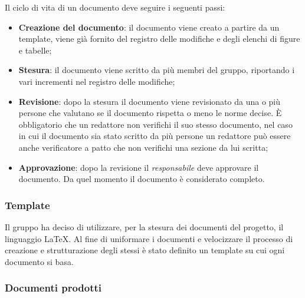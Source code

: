 Il ciclo di vita di un documento deve seguire i seguenti passi:
\begin{itemize}
    \item \textbf{Creazione del documento}: il documento viene creato a partire da un template, viene già fornito del registro delle modifiche e degli elenchi di figure e tabelle;
    \item \textbf{Stesura}: il documento viene scritto da più membri del gruppo, riportando i vari incrementi nel registro delle modifiche;
    \item \textbf{Revisione}: dopo la stesura il documento viene revisionato da una o più persone che valutano se il documento rispetta o meno le norme decise. È obbligatorio che un redattore non verifichi il suo stesso documento, nel caso in cui il documento sia stato scritto da più persone un redattore può essere anche verificatore a patto che non verifichi una sezione da lui scritta;
    \item \textbf{Approvazione}: dopo la revisione il \emph{responsabile} deve approvare il documento. Da quel momento il documento è considerato completo.
\end{itemize}

\subsubsection{Template}
\label{ssub:template}

Il gruppo ha deciso di utilizzare, per la stesura dei documenti del progetto, il linguaggio \LaTeX. Al fine di 
uniformare i documenti e velocizzare il processo di creazione e strutturazione degli stessi è stato definito un 
template su cui ogni documento si basa.

\subsubsection{Documenti prodotti}
\label{ssub:documenti_prodotti}

